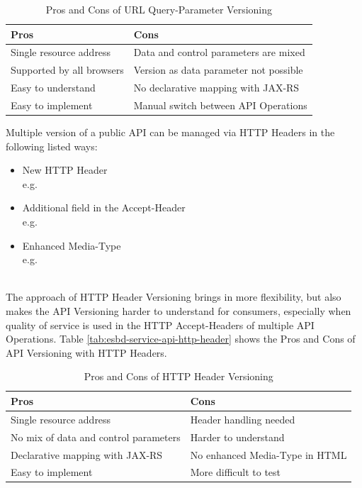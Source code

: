 {\renewcommand{\arraystretch}{1.2}%
	\begin{table}[h]
		\begin{tabularx}{\textwidth}{ X|X }	
			\textbf{Pros}                 & \textbf{Cons}    \\  \hline
			Single resource address       & Data and control parameters are mixed  \\ \hline
			Supported by all browsers     & Version as data parameter not possible \\ \hline
			Easy to understand            & No declarative mapping with JAX-RS     \\ \hline
			Easy to implement             & Manual switch between API Operations   \\ \hline
		\end{tabularx}
		\caption{Pros and Cons of URL Query-Parameter Versioning}
		\label{tab:esbd-service-api-query-param}
\end{table}}

Multiple version of a public API can be managed via HTTP Headers in the following listed ways:
\begin{itemize}
	\item New HTTP Header \\
	e.g. 
	\item Additional field in the Accept-Header \\
	e.g. 
	\item Enhanced Media-Type \\
	e.g. 
\end{itemize}
\ \\
The approach of HTTP Header Versioning brings in more flexibility, but also makes the API Versioning harder to understand for consumers, especially when quality of service is used in the HTTP Accept-Headers of multiple API Operations. Table \vref{tab:esbd-service-api-http-header} shows the Pros and Cons of API Versioning with HTTP Headers.

{\renewcommand{\arraystretch}{1.2}%
\begin{table}[h]
	\begin{tabularx}{\textwidth}{ X|X }	
		\textbf{Pros}                         & \textbf{Cons}                  \\ \hline
		Single resource address               & Header handling needed         \\ \hline  
		No mix of data and control parameters & Harder to understand           \\ \hline
		Declarative mapping with JAX-RS       & No enhanced Media-Type in HTML \\ \hline
		Easy to implement                     & More difficult to test         \\ \hline
	\end{tabularx}
	\caption{Pros and Cons of HTTP Header Versioning}
	\label{tab:esbd-service-api-http-header}
\end{table}}

